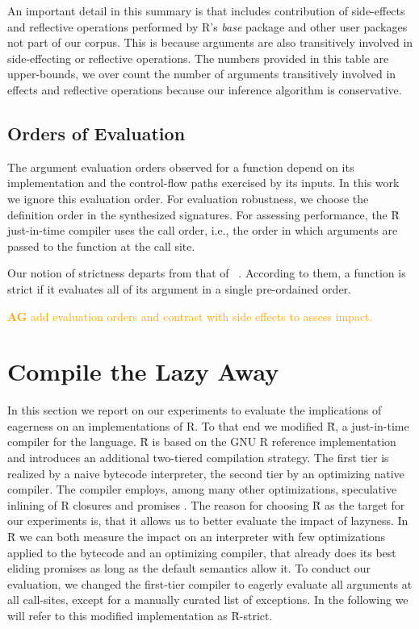 \documentclass[review,nonacm,screen,acmsmall,anonymous=true]{acmart}
\newcommand{\authorcomment}[3]{\xspace\textcolor{#1}{{\bf #2} #3}\xspace}
\newcommand{\AG}[1]{\authorcomment{orange}{AG}{#1}}
\renewcommand{\Rsh}{{\sf\u R}\xspace}
\newcommand{\Rshstrict}{{\sf\u R-strict}\xspace}
\begin{document}
An important detail in this summary is that includes contribution of
side-effects and reflective operations performed by R's \emph{base} package and
other user packages not part of our corpus. This is because arguments are also
transitively involved in side-effecting or reflective operations. The numbers
provided in this table are upper-bounds, we over count the number of arguments
transitively involved in effects and reflective operations because our inference
algorithm is conservative.

\subsection{Orders of Evaluation}

The argument evaluation orders observed for a function depend on its
implementation and the control-flow paths exercised by its inputs. In this work
we ignore this evaluation order. For evaluation robustness, we choose the
definition order in the synthesized signatures. For assessing performance, the
\Rsh just-in-time compiler uses the call order, i.e., the order in which
arguments are passed to the function at the call site.

Our notion of strictness departs from that of ~\citet{oopsla19b}. According to
them, a function is strict if it evaluates all of its argument in a single
pre-ordained order.

\AG{add evaluation orders and contrast with side effects to assess impact.}


\section{Compile the Lazy Away}

In this section we report on our experiments to evaluate the implications of
eagerness on an implementations of R. To that end we modified \Rsh, a just-in-time
compiler for the language. \Rsh is based on the GNU R reference implementation
and introduces an additional two-tiered compilation strategy. The
first tier is realized by a naive bytecode interpreter, the second tier
by an optimizing native compiler. The compiler employs, among many other
optimizations, speculative inlining of R closures and promises \citep{dls19,
oopsla20c}.
The reason for choosing \Rsh as the target for our
experiments is, that it allows us to better evaluate the impact of lazyness. In
\Rsh we can both measure the impact on an interpreter with few optimizations
applied to the bytecode and an optimizing compiler, that already does its best
eliding promises as long as the default semantics allow it.
To conduct our evaluation, we changed the first-tier
compiler to eagerly evaluate all arguments at all call-sites, except for a
manually curated list of exceptions.
In the following we will refer
to this modified implementation as \Rshstrict.
\end{document}
